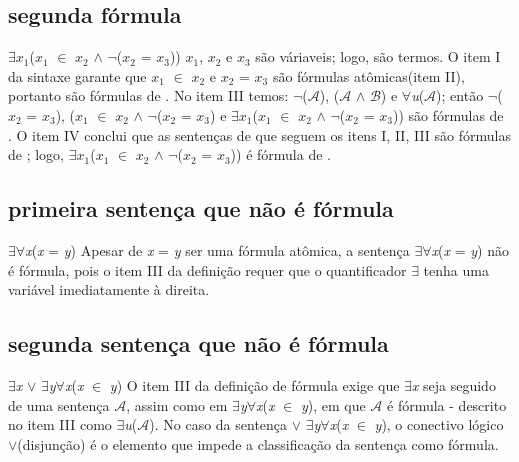 \subsection{segunda fórmula}
{$\exists$\textit{$x_1$}(\textit{$x_1$} $\in$ \textit{$x_2$} $\land$ $\lnot$($x_2$ = \textit{$x_3$}}))
\newline
\textit{$x_1$}, \textit{$x_2$} e \textit{$x_3$} são váriaveis; logo, são termos. O item I da sintaxe  garante que \textit{$x_1$} $\in$ \textit{$x_2$} e $x_2$ = \textit{$x_3$} são fórmulas atômicas(item II), portanto são fórmulas de . No item III temos:  $\neg$($\mathcal{A}$), ($\mathcal{A}$ $\land$ $\mathcal{B}$) e  $\forall$\textit{u}($\mathcal{A}$); então $\lnot$($x_2$ = \textit{$x_3$}), \newline(\textit{$x_1$} $\in$ \textit{$x_2$} $\land$ $\lnot$($x_2$ = \textit{$x_3$}) e {$\exists$\textit{$x_1$}(\textit{$x_1$} $\in$ \textit{$x_2$} $\land$ $\lnot$($x_2$ = \textit{$x_3$}})) são fórmulas de . O item IV conclui que as sentenças de  que seguem os itens I, II, III são fórmulas de ; logo,  {$\exists$\textit{$x_1$}(\textit{$x_1$} $\in$ \textit{$x_2$} $\land$ $\lnot$($x_2$ = \textit{$x_3$}})) é fórmula de .

\subsection{primeira sentença que não é fórmula}
{$\exists$$\forall$\textit{x}(\textit{x} = \textit{y})}
\newline
Apesar de \textit{x} = \textit{y} ser uma fórmula atômica, a sentença {$\exists$$\forall$\textit{x}(\textit{x} = \textit{y})} não é fórmula, pois o item III da definição requer que o quantificador $\exists$ tenha uma variável imediatamente à direita.

\subsection{segunda sentença que não é fórmula}
{$\exists$\textit{x} $\lor$ $\exists$\textit{y}$\forall$\textit{x}(\textit{x} $\in$ \textit{y})}
\newline
O item III da definição de fórmula exige que $\exists$\textit{x} seja seguido de uma sentença $\mathcal{A}$, assim como em $\exists$\textit{y}$\forall$\textit{x}(\textit{x} $\in$ \textit{y}), em que $\mathcal{A}$ é fórmula - descrito no item III como $\exists$\textit{u}($\mathcal{A}$). No caso da sentença $\lor$ $\exists$\textit{y}$\forall$\textit{x}(\textit{x} $\in$ \textit{y}), o conectivo lógico $\lor$(disjunção) é o elemento que impede a classificação da sentença como fórmula.